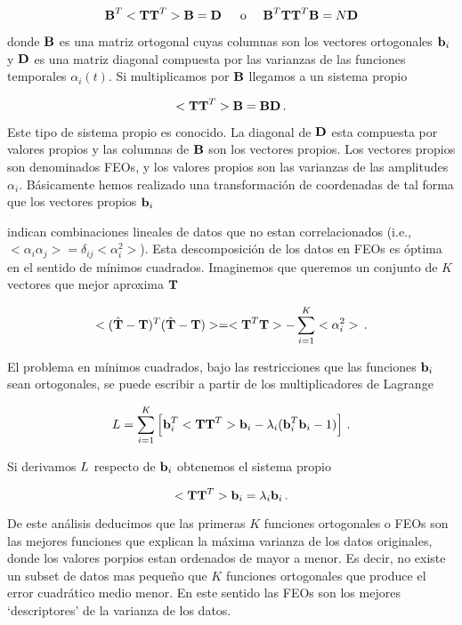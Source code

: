 \documentclass[
]{agujournal2019}
\begin{document}
\[{\textbf B}^T<{\textbf T}{\textbf T}^T>{\textbf B}={\textbf D}\,\,\,\,\,\,\,\,\,{\rm o}\,\,\,\,\,\,\,\,{\textbf B}^T{\textbf T}{\textbf T}^T{\textbf B}=N{\textbf D}\]

donde \({\textbf B}\) es una matriz ortogonal cuyas columnas son los
vectores ortogonales \({\textbf b}_i\) y \({\textbf D}\) es una matriz
diagonal compuesta por las varianzas de las funciones temporales
\(\alpha_i(t)\). Si multiplicamos por \({\textbf B}\) llegamos a un
sistema propio

\[<{\textbf T}{\textbf T}^T>{\textbf B}={\textbf B}{\textbf D}\,.\]

Este tipo de sistema propio es conocido. La diagonal de \({\textbf D}\)
esta compuesta por valores propios y las columnas de \({\textbf B}\) son
los vectores propios. Los vectores propios son denominados FEOs, y los
valores propios son las varianzas de las amplitudes \(\alpha_i\).
Básicamente hemos realizado una transformación de coordenadas de tal
forma que los vectores propios \({\textbf b}_i\)

indican combinaciones lineales de datos que no estan correlacionados
(i.e., \(<\alpha_i \alpha_j>=\delta_{ij}<\alpha^2_i>\)). Esta
descomposición de los datos en FEOs es óptima en el sentido de mínimos
cuadrados. Imaginemos que queremos un conjunto de \(K\) vectores que
mejor aproxima \({\textbf T}\)

\[<(\hat{\textbf T}-{\textbf T})^T(\hat{\textbf T}-{\textbf T})>=<{\textbf T}^T{\textbf T}>
  -\sum\limits^K_{i=1}<\alpha^2_i>\,.\]

El problema en mínimos cuadrados, bajo las restricciones que las
funciones \({\textbf b}_i\) sean ortogonales, se puede escribir a partir
de los multiplicadores de Lagrange

\[{\textbf \cal L}=\sum\limits^K_{i=1}\left[{\textbf b}^T_i<{\textbf T}{\textbf T}^T>{\textbf b}_i-
            \lambda_i({\textbf b}_i^T{\textbf b}_i-1)\right]\,.\]

Si derivamos \({\textbf \cal L}\) respecto de \({\textbf b}_i\)
obtenemos el sistema propio

\[<{\textbf T}{\textbf T}^T>{\textbf b}_i=\lambda_i{\textbf b}_i\,.\]

De este análisis deducimos que las primeras \(K\) funciones ortogonales
o FEOs son las mejores funciones que explican la máxima varianza de los
datos originales, donde los valores porpios estan ordenados de mayor a
menor. Es decir, no existe un subset de datos mas pequeño que \(K\)
funciones ortogonales que produce el error cuadrático medio menor. En
este sentido las FEOs son los mejores `descriptores' de la varianza de
los datos.
\end{document}
